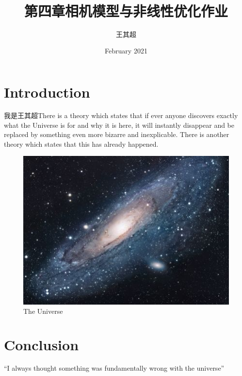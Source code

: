\documentclass{article}
\title{第四章相机模型与非线性优化作业}
\author{王其超}
\date{February 2021}
\begin{document}
\maketitle

\section{Introduction}
我是王其超There is a theory which states that if ever anyone discovers exactly what the Universe is for and why it is here, it will instantly disappear and be replaced by something even more bizarre and inexplicable.
There is another theory which states that this has already happened.

\begin{figure}[h!]
\centering
\includegraphics[scale=1.7]{universe}
\caption{The Universe}
\label{fig:universe}
\end{figure}

\section{Conclusion}
``I always thought something was fundamentally wrong with the universe'' \citep{adams1995hitchhiker}
\end{document}
